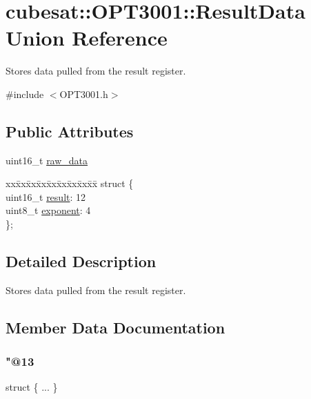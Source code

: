 \hypertarget{unioncubesat_1_1OPT3001_1_1ResultData}{}\section{cubesat\+:\+:O\+P\+T3001\+:\+:Result\+Data Union Reference}
\label{unioncubesat_1_1OPT3001_1_1ResultData}


Stores data pulled from the result register.  




{\ttfamily \#include $<$O\+P\+T3001.\+h$>$}

\subsection*{Public Attributes}
\begin{DoxyCompactItemize}
\item 
uint16\+\_\+t \hyperlink{unioncubesat_1_1OPT3001_1_1ResultData_a5ea98dd31e38211d159635b818bff4f7}{raw\+\_\+data}
\item 
\begin{tabbing}
xx\=xx\=xx\=xx\=xx\=xx\=xx\=xx\=xx\=\kill
struct \{\\
\>uint16\_t \hyperlink{unioncubesat_1_1OPT3001_1_1ResultData_ac5479564c6231cfb6701b1dd5e411d01}{result}: 12\\
\>uint8\_t \hyperlink{unioncubesat_1_1OPT3001_1_1ResultData_acfca7cad4bdd0488cde78fc3944d6465}{exponent}: 4\\
\}; \\

\end{tabbing}\end{DoxyCompactItemize}


\subsection{Detailed Description}
Stores data pulled from the result register. 

\subsection{Member Data Documentation}
\mbox{\label{unioncubesat_1_1OPT3001_1_1ResultData_ad760501899e98d60c7d0f5763b0a1c54}} 
\subsubsection{\texorpdfstring{"@13}{@13}}
{\footnotesize\ttfamily struct \{ ... \} }

